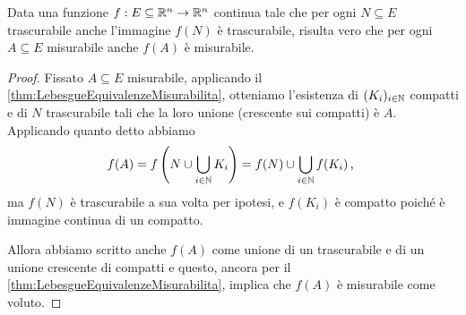 \begin{proposition}\label{prop:ContinueSpecialiTengonoMisurabili}
	Data una funzione $f:E\subseteq\mathbb R^n\to\mathbb R^n$ continua tale che per ogni $N\subseteq E$ trascurabile anche l'immagine $f(N)$ è trascurabile, risulta vero che per ogni $A\subseteq E$ misurabile anche $f(A)$ è misurabile.
\end{proposition}
\begin{proof}
	Fissato $A\subseteq E$ misurabile, applicando il \cref{thm:LebesgueEquivalenzeMisurabilita}, otteniamo l'esistenza di $(K_i)_{i\in\mathbb N}$ compatti e di $N$ trascurabile tali che la loro unione (crescente sui compatti) è $A$. Applicando quanto detto abbiamo
	\begin{equation*}
		f(A)=f\left(N\cup\bigcup_{i\in\mathbb N}K_i\right)=f(N)\cup\bigcup_{i\in\mathbb N}f(K_i) \, \text{, }
	\end{equation*}
	ma $f(N)$ è trascurabile a sua volta per ipotesi, e $f(K_i)$ è compatto poiché è immagine continua di un compatto.
	
	Allora abbiamo scritto anche $f(A)$ come unione di un trascurabile e di un unione crescente di compatti e questo, ancora per il \cref{thm:LebesgueEquivalenzeMisurabilita}, implica che $f(A)$ è misurabile come voluto.
\end{proof}

